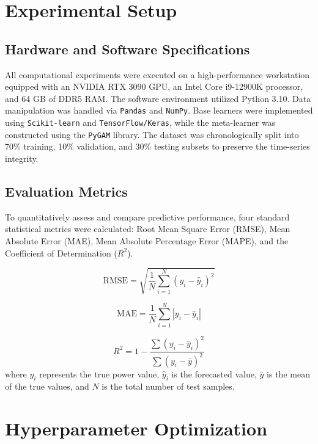 \documentclass[conference]{IEEEtran}
\begin{document}

\section{Experimental Setup}

\subsection{Hardware and Software Specifications}
All computational experiments were executed on a high-performance workstation equipped with an NVIDIA RTX 3090 GPU, an Intel Core i9-12900K processor, and 64 GB of DDR5 RAM. The software environment utilized Python 3.10. Data manipulation was handled via \texttt{Pandas} and \texttt{NumPy}. Base learners were implemented using \texttt{Scikit-learn} and \texttt{TensorFlow/Keras}, while the meta-learner was constructed using the \texttt{PyGAM} library. The dataset was chronologically split into 70\% training, 10\% validation, and 30\% testing subsets to preserve the time-series integrity.

\subsection{Evaluation Metrics}
To quantitatively assess and compare predictive performance, four standard statistical metrics were calculated: Root Mean Square Error (RMSE), Mean Absolute Error (MAE), Mean Absolute Percentage Error (MAPE), and the Coefficient of Determination ($R^2$).

\begin{equation}
\text{RMSE} = \sqrt{\frac{1}{N} \sum_{i=1}^{N} (y_i - \hat{y}_i)^2}
\end{equation}

\begin{equation}
\text{MAE} = \frac{1}{N} \sum_{i=1}^{N} |y_i - \hat{y}_i|
\end{equation}

\begin{equation}
R^2 = 1 - \frac{\sum (y_i - \hat{y}_i)^2}{\sum (y_i - \bar{y})^2}
\end{equation}
where $y_i$ represents the true power value, $\hat{y}_i$ is the forecasted value, $\bar{y}$ is the mean of the true values, and $N$ is the total number of test samples.

\section{Hyperparameter Optimization}
\end{document}
